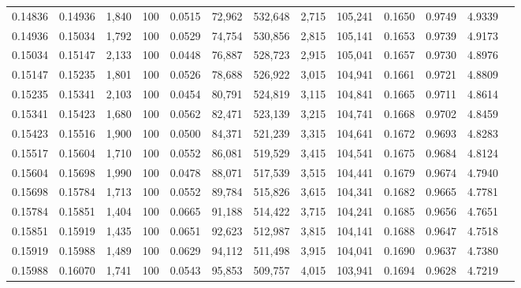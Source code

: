\begin{tabular}{rrrrrrrrrrrrr}
0.14836 & 0.14936 & 1,840 & 100 &                                     0.0515 &  72,962 & 532,648 &   2,715 & 105,241 & 0.1650 & 0.9749 & 4.9339 \\
0.14936 & 0.15034 & 1,792 & 100 &                                     0.0529 &  74,754 & 530,856 &   2,815 & 105,141 & 0.1653 & 0.9739 & 4.9173 \\
0.15034 & 0.15147 & 2,133 & 100 &                                     0.0448 &  76,887 & 528,723 &   2,915 & 105,041 & 0.1657 & 0.9730 & 4.8976 \\
0.15147 & 0.15235 & 1,801 & 100 &                                     0.0526 &  78,688 & 526,922 &   3,015 & 104,941 & 0.1661 & 0.9721 & 4.8809 \\
0.15235 & 0.15341 & 2,103 & 100 &                                     0.0454 &  80,791 & 524,819 &   3,115 & 104,841 & 0.1665 & 0.9711 & 4.8614 \\
0.15341 & 0.15423 & 1,680 & 100 &                                     0.0562 &  82,471 & 523,139 &   3,215 & 104,741 & 0.1668 & 0.9702 & 4.8459 \\
0.15423 & 0.15516 & 1,900 & 100 &                                     0.0500 &  84,371 & 521,239 &   3,315 & 104,641 & 0.1672 & 0.9693 & 4.8283 \\
0.15517 & 0.15604 & 1,710 & 100 &                                     0.0552 &  86,081 & 519,529 &   3,415 & 104,541 & 0.1675 & 0.9684 & 4.8124 \\
0.15604 & 0.15698 & 1,990 & 100 &                                     0.0478 &  88,071 & 517,539 &   3,515 & 104,441 & 0.1679 & 0.9674 & 4.7940 \\
0.15698 & 0.15784 & 1,713 & 100 &                                     0.0552 &  89,784 & 515,826 &   3,615 & 104,341 & 0.1682 & 0.9665 & 4.7781 \\
0.15784 & 0.15851 & 1,404 & 100 &                                     0.0665 &  91,188 & 514,422 &   3,715 & 104,241 & 0.1685 & 0.9656 & 4.7651 \\
0.15851 & 0.15919 & 1,435 & 100 &                                     0.0651 &  92,623 & 512,987 &   3,815 & 104,141 & 0.1688 & 0.9647 & 4.7518 \\
0.15919 & 0.15988 & 1,489 & 100 &                                     0.0629 &  94,112 & 511,498 &   3,915 & 104,041 & 0.1690 & 0.9637 & 4.7380 \\
0.15988 & 0.16070 & 1,741 & 100 &                                     0.0543 &  95,853 & 509,757 &   4,015 & 103,941 & 0.1694 & 0.9628 & 4.7219 \\

\end{tabular}
